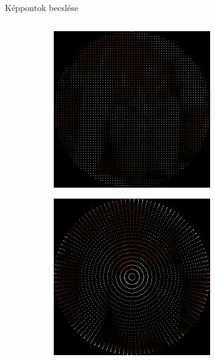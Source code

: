 \documentclass{beamer}
\begin{document}
\begin{frame}{Képpontok becslése}
\begin{columns}
\begin{column}{0.5\textwidth}
\begin{figure}
\begin{subfigure}{.48\textwidth}
            \includegraphics[width=\textwidth]{figures/pepper_square.png}
            \end{subfigure}
            \begin{subfigure}{.48\textwidth}
                \centering
            \includegraphics[width=\textwidth]{figures/pepper_bilinear.png}

\end{subfigure}
\end{figure}
\end{column}
\end{columns}
\end{frame}
\end{document}
